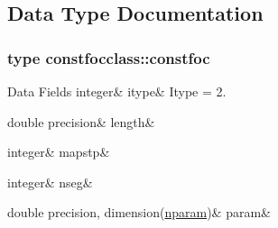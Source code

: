 \subsection{Data Type Documentation}
\label{structconstfocclass_1_1constfoc}
\subsubsection{type constfocclass\+::constfoc}
\begin{DoxyFields}{Data Fields}
\mbox{\label{namespaceconstfocclass_a6805e237c322783df518e8f2c3e1feec}} 
integer&
itype&
Itype = 2. \\
\hline

\mbox{\label{namespaceconstfocclass_a20a95ee3a0c6fd8f128d4fbe911077db}} 
double precision&
length&
\\
\hline

\mbox{\label{namespaceconstfocclass_a7211bb49a75643cd5898f13851eb852e}} 
integer&
mapstp&
\\
\hline

\mbox{\label{namespaceconstfocclass_ad5d129a88d9e84629813d001b6379bf5}} 
integer&
nseg&
\\
\hline

\mbox{\label{namespaceconstfocclass_a91cddf45b9010e35e24ae6cd063a9ee7}} 
double precision, dimension(\mbox{\hyperlink{namespaceconstfocclass_a4a04b85ebc26340b40e7c38cfad62bc1}{nparam}})&
param&
\\
\hline

\end{DoxyFields}
